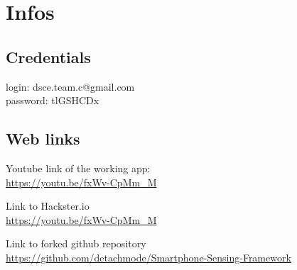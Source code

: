 \chapter*{Infos}
\section*{Credentials}
login: dsce.team.c@gmail.com \\
password: tlGSHCDx


\section*{Web links}
Youtube link of the working app: \\
\url{https://youtu.be/fxWv-CpMm_M}

Link to Hackster.io \\
\url{https://youtu.be/fxWv-CpMm_M}

Link to forked github repository \\
\url{https://github.com/detachmode/Smartphone-Sensing-Framework}